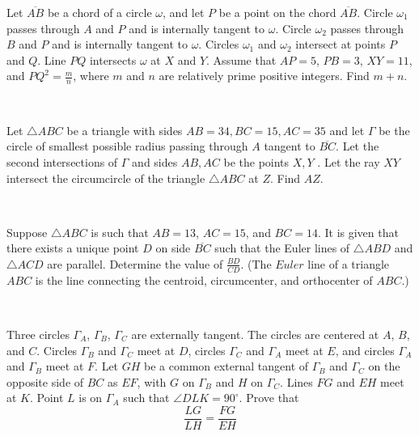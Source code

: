 \documentclass{article}
\begin{document}
\begin{prob}[AIME I 2019/15]{9}
Let $\overline{AB}$ be a chord of a circle $\omega$, and let $P$ be a point on the chord $\overline{AB}$. Circle $\omega_1$ passes through $A$ and $P$ and is internally tangent to $\omega$. Circle $\omega_2$ passes through $B$ and $P$ and is internally tangent to $\omega$. Circles $\omega_1$ and $\omega_2$ intersect at points $P$ and $Q$. Line $PQ$ intersects $\omega$ at $X$ and $Y$. Assume that $AP=5$, $PB=3$, $XY=11$, and $PQ^2 = \tfrac{m}{n}$, where $m$ and $n$ are relatively prime positive integers. Find $m+n$.
\end{prob}\\
\begin{req}[PuMaC 2020 G7]{9}
Let $\triangle ABC$ be a triangle with sides $AB = 34, BC = 15, AC = 35$ and let $\Gamma$ be the circle of smallest possible radius passing through $A$ tangent to $\overline{BC}$. Let the second intersections of $\Gamma$ and sides $AB, AC$ be the points $X, Y$ . Let the ray $XY$ intersect the circumcircle of the triangle $\triangle ABC$ at $Z$. Find $AZ$.
\end{req}\\
\begin{prob}[CMIMC 2017 G10]{9}
Suppose $\triangle ABC$ is such that $AB=13$, $AC=15$, and $BC=14$. It is given that there exists a unique point $D$ on side $\overline{BC}$ such that the Euler lines of $\triangle ABD$ and $\triangle ACD$ are parallel. Determine the value of $\tfrac{BD}{CD}$. (The $\textit{Euler}$ line of a triangle $ABC$ is the line connecting the centroid, circumcenter, and orthocenter of $ABC$.)
\end{prob}\\
\begin{prob}[USMCA 2021/29]{13}
Three circles $\Gamma_A$, $\Gamma_B$, $\Gamma_C$ are externally tangent. The circles are centered at $A$, $B$, and $C$. Circles $\Gamma_B$ and $\Gamma_C$ meet at $D$, circles $\Gamma_C$ and $\Gamma_A$ meet at $E$, and circles $\Gamma_A$ and $\Gamma_B$ meet at $F$. Let $GH$ be a common external tangent of $\Gamma_B$ and $\Gamma_C$ on the opposite side of $BC$ as $EF$, with $G$ on $\Gamma_B$ and $H$ on $\Gamma_C$. Lines $FG$ and $EH$ meet at $K$. Point $L$ is on $\Gamma_A$ such that $\angle DLK = 90^\circ$. Prove that 
\[\frac{LG}{LH}=\frac{FG}{EH}\]
\end{prob}
\end{document}
